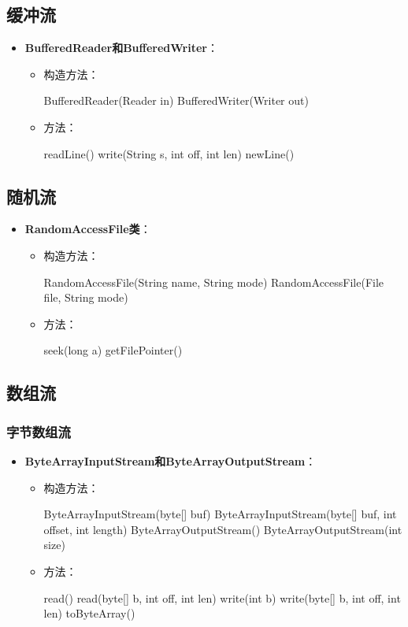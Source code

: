 \documentclass[a4paper, 10pt]{ctexart}
\begin{document}
\subsection{缓冲流}
\begin{itemize}
  \item \textbf{BufferedReader和BufferedWriter}：
  \begin{itemize}
    \item 构造方法：
    \begin{codeblock}
BufferedReader(Reader in)
BufferedWriter(Writer out)
    \end{codeblock}
    \item 方法：
    \begin{codeblock}
readLine()
write(String s, int off, int len)
newLine()
    \end{codeblock}
  \end{itemize}
\end{itemize}

\subsection{随机流}
\begin{itemize}
  \item \textbf{RandomAccessFile类}：
  \begin{itemize}
    \item 构造方法：
    \begin{codeblock}
RandomAccessFile(String name, String mode)
RandomAccessFile(File file, String mode)
    \end{codeblock}
    \item 方法：
    \begin{codeblock}
seek(long a)
getFilePointer()
    \end{codeblock}
  \end{itemize}
\end{itemize}

\subsection{数组流}
\subsubsection{字节数组流}
\begin{itemize}
  \item \textbf{ByteArrayInputStream和ByteArrayOutputStream}：
  \begin{itemize}
    \item 构造方法：
    \begin{codeblock}
ByteArrayInputStream(byte[] buf)
ByteArrayInputStream(byte[] buf, int offset, int length)
ByteArrayOutputStream()
ByteArrayOutputStream(int size)
    \end{codeblock}
    \item 方法：
    \begin{codeblock}
read()
read(byte[] b, int off, int len)
write(int b)
write(byte[] b, int off, int len)
toByteArray()
    \end{codeblock}
  \end{itemize}
\end{itemize}
\end{document}
